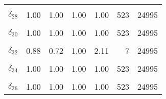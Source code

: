 \begin{table}
\begin{tabular}[t]{lrrrrrr}
\cellcolor{gray!6}{$\delta_{27}$} & \cellcolor{gray!6}{0.74} & \cellcolor{gray!6}{0.46} & \cellcolor{gray!6}{1.00} & \cellcolor{gray!6}{2.69} & \cellcolor{gray!6}{9} & \cellcolor{gray!6}{24995}\\
$\delta_{28}$ & 1.00 & 1.00 & 1.00 & 1.00 & 523 & 24995\\
\cellcolor{gray!6}{$\delta_{29}$} & \cellcolor{gray!6}{1.00} & \cellcolor{gray!6}{1.00} & \cellcolor{gray!6}{1.00} & \cellcolor{gray!6}{1.10} & \cellcolor{gray!6}{37} & \cellcolor{gray!6}{24995}\\
$\delta_{30}$ & 1.00 & 1.00 & 1.00 & 1.00 & 523 & 24995\\
\cellcolor{gray!6}{$\delta_{31}$} & \cellcolor{gray!6}{0.70} & \cellcolor{gray!6}{0.54} & \cellcolor{gray!6}{1.00} & \cellcolor{gray!6}{3.53} & \cellcolor{gray!6}{7} & \cellcolor{gray!6}{8}\\
$\delta_{32}$ & 0.88 & 0.72 & 1.00 & 2.11 & 7 & 24995\\
\cellcolor{gray!6}{$\delta_{33}$} & \cellcolor{gray!6}{0.90} & \cellcolor{gray!6}{0.72} & \cellcolor{gray!6}{1.00} & \cellcolor{gray!6}{3.33} & \cellcolor{gray!6}{6} & \cellcolor{gray!6}{24995}\\
$\delta_{34}$ & 1.00 & 1.00 & 1.00 & 1.00 & 523 & 24995\\
\cellcolor{gray!6}{$\delta_{35}$} & \cellcolor{gray!6}{1.00} & \cellcolor{gray!6}{1.00} & \cellcolor{gray!6}{1.00} & \cellcolor{gray!6}{1.00} & \cellcolor{gray!6}{523} & \cellcolor{gray!6}{24995}\\
$\delta_{36}$ & 1.00 & 1.00 & 1.00 & 1.00 & 523 & 24995\\
\bottomrule
\end{tabular}
\end{table}